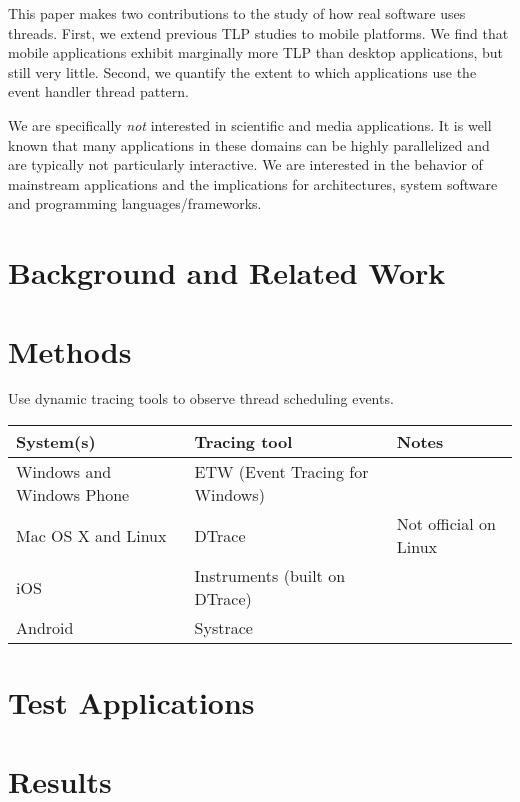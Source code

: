 \documentclass[11pt]{sigplanconf}
\begin{document}
This paper makes two contributions to the study of how real software
uses threads.  First, we extend previous TLP studies to mobile
platforms.  We find that mobile applications exhibit marginally more TLP
than desktop applications, but still very little.  Second, we quantify
the extent to which applications use the event handler thread pattern.

We are specifically \emph{not} interested in scientific and media
applications.  It is well known that many applications in these domains
can be highly parallelized and are typically not particularly
interactive.  We are interested in the behavior of mainstream
applications and the implications for architectures, system software and
programming languages/frameworks.

\section{Background and Related Work}

\section{Methods}

Use dynamic tracing tools to observe thread scheduling events.

\begin{table*}

\begin{tabular}{l|l|l}
System(s) & Tracing tool & Notes \\
\hline
Windows and Windows Phone & ETW (Event Tracing for Windows) & \\
Mac OS X and Linux        & DTrace                          & Not official on Linux \\
iOS                       & Instruments (built on DTrace)   & \\
Android                   & Systrace                        & 
\end{tabular}

\end{table*}

\section{Test Applications}

\section{Results}
\end{document}
